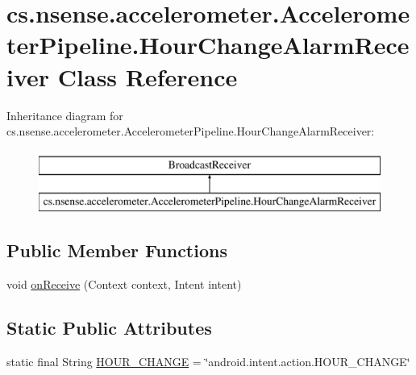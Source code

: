 \hypertarget{classcs_1_1nsense_1_1accelerometer_1_1_accelerometer_pipeline_1_1_hour_change_alarm_receiver}{\section{cs.\-nsense.\-accelerometer.\-Accelerometer\-Pipeline.\-Hour\-Change\-Alarm\-Receiver Class Reference}
\label{classcs_1_1nsense_1_1accelerometer_1_1_accelerometer_pipeline_1_1_hour_change_alarm_receiver}
}
Inheritance diagram for cs.\-nsense.\-accelerometer.\-Accelerometer\-Pipeline.\-Hour\-Change\-Alarm\-Receiver\-:\begin{figure}[H]
\begin{center}
\leavevmode
\includegraphics[height=2.000000cm]{classcs_1_1nsense_1_1accelerometer_1_1_accelerometer_pipeline_1_1_hour_change_alarm_receiver}
\end{center}
\end{figure}
\subsection*{Public Member Functions}
\begin{DoxyCompactItemize}
\item 
void \hyperlink{classcs_1_1nsense_1_1accelerometer_1_1_accelerometer_pipeline_1_1_hour_change_alarm_receiver_abb8b301d350abc508c0f9aa9a1bc231a}{on\-Receive} (Context context, Intent intent)
\end{DoxyCompactItemize}
\subsection*{Static Public Attributes}
\begin{DoxyCompactItemize}
\item 
static final String \hyperlink{classcs_1_1nsense_1_1accelerometer_1_1_accelerometer_pipeline_1_1_hour_change_alarm_receiver_a55dbfa9477826962bbb9a834da65f624}{H\-O\-U\-R\-\_\-\-C\-H\-A\-N\-G\-E} = \char`\"{}android.\-intent.\-action.\-H\-O\-U\-R\-\_\-\-C\-H\-A\-N\-G\-E\char`\"{}
\end{DoxyCompactItemize}


